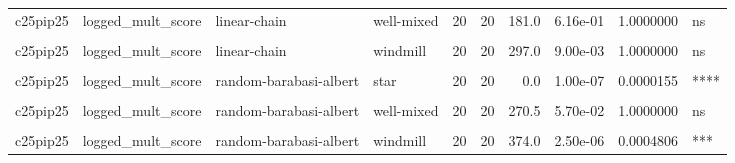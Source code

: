 \documentclass[
]{book}
\begin{document}
\begin{table}
\begin{tabular}{l|l|l|l|r|r|r|r|r|l}
\hline
\cellcolor{gray!6}{c25pip25} & \cellcolor{gray!6}{logged\_mult\_score} & \cellcolor{gray!6}{linear-chain} & \cellcolor{gray!6}{toroidal-lattice} & \cellcolor{gray!6}{20} & \cellcolor{gray!6}{20} & \cellcolor{gray!6}{191.0} & \cellcolor{gray!6}{8.17e-01} & \cellcolor{gray!6}{1.0000000} & \cellcolor{gray!6}{ns}\\
\hline
c25pip25 & logged\_mult\_score & linear-chain & well-mixed & 20 & 20 & 181.0 & 6.16e-01 & 1.0000000 & ns\\
\hline
\cellcolor{gray!6}{c25pip25} & \cellcolor{gray!6}{logged\_mult\_score} & \cellcolor{gray!6}{linear-chain} & \cellcolor{gray!6}{wheel} & \cellcolor{gray!6}{20} & \cellcolor{gray!6}{20} & \cellcolor{gray!6}{256.0} & \cellcolor{gray!6}{1.32e-01} & \cellcolor{gray!6}{1.0000000} & \cellcolor{gray!6}{ns}\\
\hline
c25pip25 & logged\_mult\_score & linear-chain & windmill & 20 & 20 & 297.0 & 9.00e-03 & 1.0000000 & ns\\
\hline
\cellcolor{gray!6}{c25pip25} & \cellcolor{gray!6}{logged\_mult\_score} & \cellcolor{gray!6}{random-barabasi-albert} & \cellcolor{gray!6}{random-waxman} & \cellcolor{gray!6}{20} & \cellcolor{gray!6}{20} & \cellcolor{gray!6}{86.0} & \cellcolor{gray!6}{2.00e-03} & \cellcolor{gray!6}{0.2760000} & \cellcolor{gray!6}{ns}\\
\hline
c25pip25 & logged\_mult\_score & random-barabasi-albert & star & 20 & 20 & 0.0 & 1.00e-07 & 0.0000155 & ****\\
\hline
\cellcolor{gray!6}{c25pip25} & \cellcolor{gray!6}{logged\_mult\_score} & \cellcolor{gray!6}{random-barabasi-albert} & \cellcolor{gray!6}{toroidal-lattice} & \cellcolor{gray!6}{20} & \cellcolor{gray!6}{20} & \cellcolor{gray!6}{314.5} & \cellcolor{gray!6}{2.00e-03} & \cellcolor{gray!6}{0.2760000} & \cellcolor{gray!6}{ns}\\
\hline
c25pip25 & logged\_mult\_score & random-barabasi-albert & well-mixed & 20 & 20 & 270.5 & 5.70e-02 & 1.0000000 & ns\\
\hline
\cellcolor{gray!6}{c25pip25} & \cellcolor{gray!6}{logged\_mult\_score} & \cellcolor{gray!6}{random-barabasi-albert} & \cellcolor{gray!6}{wheel} & \cellcolor{gray!6}{20} & \cellcolor{gray!6}{20} & \cellcolor{gray!6}{256.0} & \cellcolor{gray!6}{1.33e-01} & \cellcolor{gray!6}{1.0000000} & \cellcolor{gray!6}{ns}\\
\hline
c25pip25 & logged\_mult\_score & random-barabasi-albert & windmill & 20 & 20 & 374.0 & 2.50e-06 & 0.0004806 & ***\\
\hline

\end{tabular}
\end{table}
\end{document}
